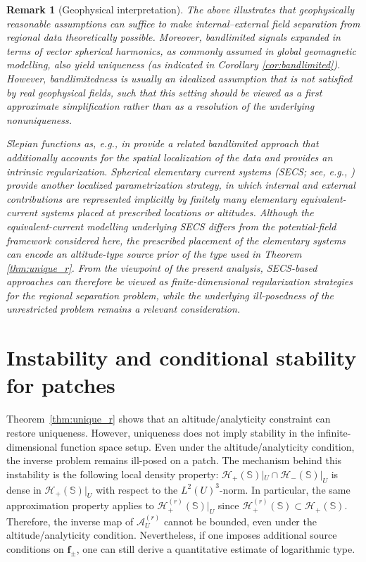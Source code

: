 \documentclass[a4paper, 11pt]{article}
\newtheorem{remark}[theorem]{Remark}
\renewcommand{\SS}{\mathbb{S}}
\newcommand{\f}{\mathbf{f}}
\begin{document}
\begin{remark}[Geophysical interpretation]\label{rem:geo-nonunique2}
The above illustrates that geophysically reasonable assumptions can suffice to make internal--external field separation from regional data theoretically possible. Moreover, bandlimited signals expanded in terms of vector spherical harmonics, as commonly assumed in global geomagnetic modelling, also yield uniqueness (as indicated in Corollary \ref{cor:bandlimited}). However, bandlimitedness is usually an idealized assumption that is not satisfied by real geophysical fields, such that this setting should be viewed as a first approximate simplification rather than as a resolution of the underlying nonuniqueness. 

Slepian functions as, e.g., in \cite{plamazger24,plattnersimons14b,Plattner2017} provide a related bandlimited approach that additionally accounts for the spatial localization of the data and provides an intrinsic regularization. 
Spherical elementary current systems (SECS; see, e.g., \cite{Vanhamki2019,Pulkkinen2014}) provide another localized parametrization strategy, in which internal and external contributions are represented implicitly by finitely many elementary equivalent-current systems placed at prescribed locations or altitudes. Although the equivalent-current modelling underlying SECS differs from the potential-field framework considered here, the prescribed placement of the elementary systems can encode an
altitude-type source prior of the type used in Theorem \ref{thm:unique_r}. From the viewpoint of the present analysis, SECS-based approaches can therefore be viewed as finite-dimensional regularization strategies for the regional separation problem, while the underlying ill-posedness of the unrestricted problem remains a relevant consideration.


\end{remark}




\section{Instability and conditional stability for patches}\label{sec:instab}

Theorem~\ref{thm:unique_r} shows that an altitude/analyticity constraint can restore uniqueness. However, uniqueness does not imply stability in the infinite-dimensional function space setup. Even under the altitude/analyticity condition, the inverse problem remains ill-posed on a patch. The mechanism behind this instability is the following local density property: $\mathcal H_+(\SS)|_{U} \cap \mathcal H_-(\SS)|_{U}$ is dense in $\mathcal H_+(\SS)|_{U}$ with respect to the $L^2(U)^3$-norm. In particular, the same approximation property applies to $\mathcal H_+^{(r)}(\SS)|_{U}$ since $\mathcal H_+^{(r)}(\SS)\subset \mathcal H_+(\SS)$. Therefore, the inverse map of $\mathcal A_U^{(r)}$ cannot be bounded, even under the altitude/analyticity condition. Nevertheless, if one imposes additional source conditions on $\f_\pm$, one can still derive a quantitative estimate of logarithmic type.
\end{document}
